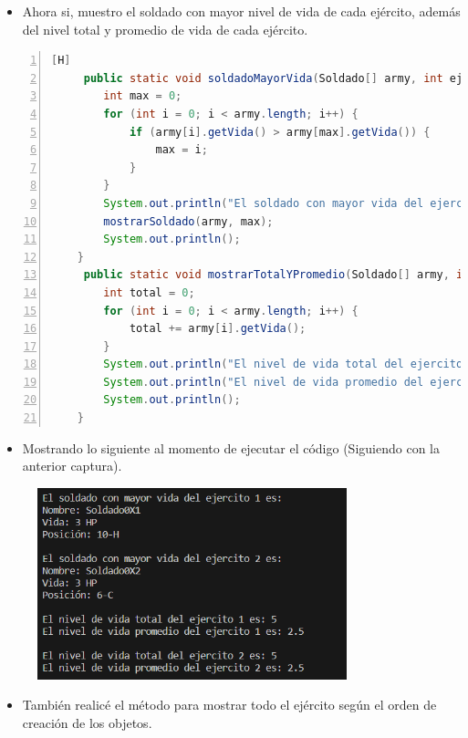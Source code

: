 \documentclass{article}
\begin{document}
	\begin{itemize}	
		\item Ahora si, muestro el soldado con mayor nivel de vida de cada ejército, además del nivel total y promedio de vida de cada ejército.
	\end{itemize}
	\begin{lstlisting}[language=java,caption={Mayor nivel de vida}, numbers=left][H]
	 public static void soldadoMayorVida(Soldado[] army, int ej) {
        int max = 0;
        for (int i = 0; i < army.length; i++) {
            if (army[i].getVida() > army[max].getVida()) {
                max = i;
            }
        }
        System.out.println("El soldado con mayor vida del ejercito " + ej + " es: ");
        mostrarSoldado(army, max);
        System.out.println();
    }
     public static void mostrarTotalYPromedio(Soldado[] army, int ej) {
        int total = 0;
        for (int i = 0; i < army.length; i++) {
            total += army[i].getVida();
        }
        System.out.println("El nivel de vida total del ejercito " + ej + " es: " + total);
        System.out.println("El nivel de vida promedio del ejercito " + ej + " es: " + total * 1.0 / army.length);
        System.out.println();
    }
	\end{lstlisting}
	\begin{itemize}	
		\item Mostrando lo siguiente al momento de ejecutar el código (Siguiendo con la anterior captura).
	\end{itemize}
	
	\begin{figure}[H]
		\centering
	\includegraphics[width=0.8\textwidth,keepaspectratio]{img/captura2.png}
	\end{figure}
	\begin{itemize}	
		\item También realicé el método para mostrar todo el ejército según el orden de creación de los objetos.
	\end{itemize}
	
\end{document}
